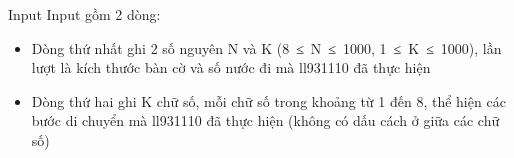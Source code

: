 Input
Input gồm 2 dòng:
\begin{itemize}
	\item Dòng thứ nhất ghi 2 số nguyên N và K (8 ≤ N ≤ 1000, 1 ≤ K ≤ 1000), lần lượt là kích thước bàn cờ và số nước đi mà ll931110 đã thực hiện
	\item Dòng thứ hai ghi K chữ số, mỗi chữ số trong khoảng từ 1 đến 8, thể hiện các bước di chuyển mà ll931110 đã thực hiện (không có dấu cách ở giữa các chữ số)
\end{itemize}